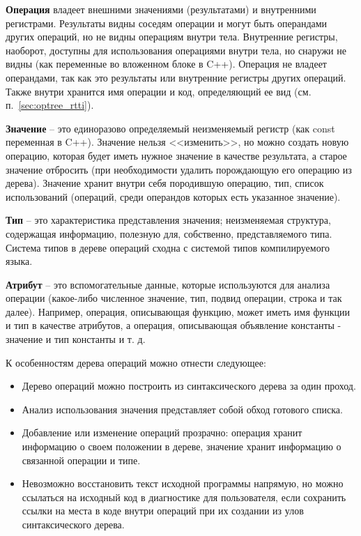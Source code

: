 \textbf{Операция} владеет внешними значениями (результатами) и внутренними регистрами.
Результаты видны соседям операции и могут быть операндами других операций, но не видны операциям внутри тела.
Внутренние регистры, наоборот, доступны для использования операциями внутри тела, но снаружи не видны (как переменные во вложенном блоке в C++).
Операция не владеет операндами, так как это результаты или внутренние регистры других операций.
Также внутри хранится имя операции и код, определяющий ее вид (см. п.~\ref{sec:optree_rtti}).

\textbf{Значение} -- это единоразово определяемый неизменяемый регистр (как const переменная в C++).
Значение нельзя <<изменить>>, но можно создать новую операцию, которая будет иметь нужное значение в качестве результата, а старое значение отбросить (при необходимости удалить порождающую его операцию из дерева).
Значение хранит внутри себя породившую операцию, тип, список использований (операций, среди операндов которых есть указанное значение).

\textbf{Тип} -- это характеристика представления значения; неизменяемая структура, содержащая информацию, полезную для, собственно, представляемого типа.
Система типов в дереве операций сходна с системой типов компилируемого языка.

\textbf{Атрибут} -- это вспомогательные данные, которые используются для анализа операции (какое-либо численное значение, тип, подвид операции, строка и так далее).
Например, операция, описывающая функцию, может иметь имя функции и тип в качестве атрибутов, а операция, описывающая объявление константы - значение и тип константы и т. д.

К особенностям дерева операций можно отнести следующее:

\begin{itemize}
    \item Дерево операций можно построить из синтаксического дерева за один проход.
    \item Анализ использования значения представляет собой обход готового списка.
    \item Добавление или изменение операций прозрачно: операция хранит информацию о своем положении в дереве, значение хранит информацию о связанной операции и типе.
    \item Невозможно восстановить текст исходной программы напрямую, но можно ссылаться на исходный код в диагностике для пользователя, если сохранить ссылки на места в коде внутри операций при их создании из улов синтаксического дерева.
\end{itemize}

